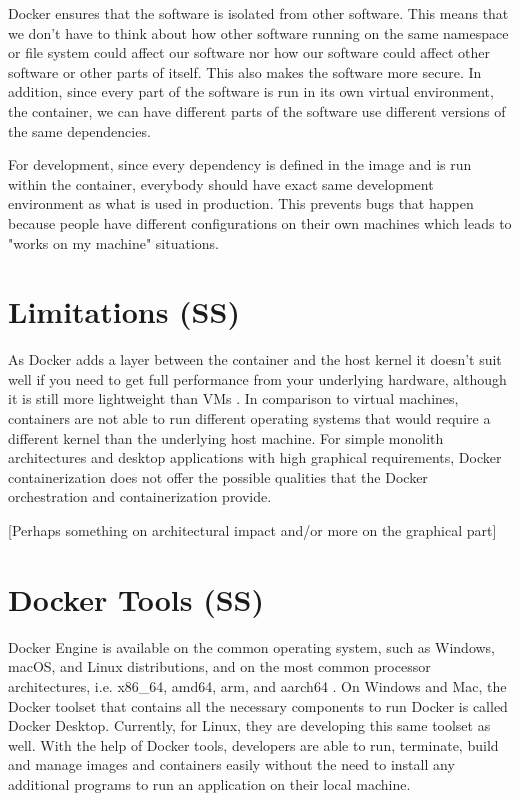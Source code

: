 \documentclass[fleqn,12pt]{olplainarticle}
\begin{document}
Docker ensures that the software is isolated from other software. This means that we don't have to think about how other software running on the same namespace or file system could affect our software nor how our software could affect other software or other parts of itself. This also makes the software more secure.
In addition, since every part of the software is run in its own virtual environment, the container, we can have different parts of the software use different versions of the same dependencies.

For development, since every dependency is defined in the image and is run within the container, everybody should have exact same development environment as what is used in production. This prevents bugs that happen because people have different configurations on their own machines which leads to "works on my machine" situations.



\section{Limitations (SS)}

As Docker adds a layer between the container and the host kernel it doesn't suit well if you need to get full performance from your underlying hardware, although it is still more lightweight than VMs \citep{cloudsavvy:not_to_use}. In comparison to virtual machines, containers are not able to run different operating systems that would require a different kernel than the underlying host machine. For simple monolith architectures and desktop applications with high graphical requirements, Docker containerization does not offer the possible qualities that the Docker orchestration and containerization provide.

[Perhaps something on architectural impact and/or more on the graphical part]

\section{Docker Tools (SS)}

Docker Engine is available on the common operating system, such as Windows, macOS, and Linux distributions, and on the most common processor architectures, i.e. x86\_64, amd64, arm, and aarch64 \citep{docker:install}.  On Windows and Mac, the Docker toolset that contains all the necessary components to run Docker is called Docker Desktop. Currently, for Linux, they are developing this same toolset as well. With the help of Docker tools, developers are able to run, terminate, build and manage images and containers easily without the need to install any additional programs to run an application on their local machine.
\end{document}
